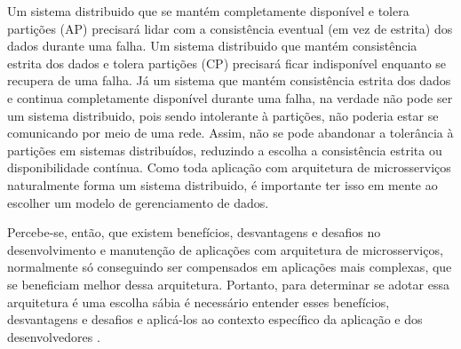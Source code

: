 Um sistema distribuido que se mantém completamente disponível e tolera partições (AP) precisará lidar com a consistência eventual (em vez de estrita) dos dados durante uma falha. Um sistema distribuido que mantém consistência estrita dos dados e tolera partições (CP) precisará ficar indisponível enquanto se recupera de uma falha. Já um sistema que mantém consistência estrita dos dados e continua completamente disponível durante uma falha, na verdade não pode ser um sistema distribuido, pois sendo intolerante à partições, não poderia estar se comunicando por meio de uma rede. Assim, não se pode abandonar a tolerância à partições em sistemas distribuídos, reduzindo a escolha a consistência estrita ou disponibilidade contínua. Como toda aplicação com arquitetura de microsserviços naturalmente forma um sistema distribuido, é importante ter isso em mente ao escolher um modelo de gerenciamento de dados. \cite{teorema-cap-ibm,livro-building-microservices}

Percebe-se, então, que existem benefícios, desvantagens e desafios no desenvolvimento e manutenção de aplicações com arquitetura de microsserviços, normalmente só conseguindo ser compensados em aplicações mais complexas, que se beneficiam melhor dessa arquitetura. Portanto, para determinar se adotar essa arquitetura é uma escolha sábia é necessário entender esses benefícios, desvantagens e desafios e aplicá-los ao contexto específico da aplicação e dos desenvolvedores \cite{martin-fowler-monolith-first}.







